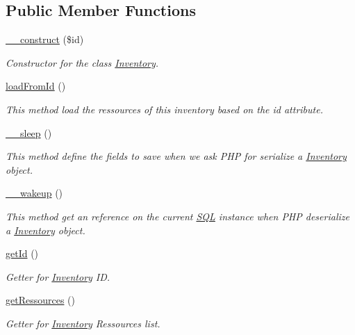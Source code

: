\subsection*{Public Member Functions}
\begin{DoxyCompactItemize}
\item 
\mbox{\hyperlink{classInventory_ad590054ec1e295007c7a7f14ecd12ac5}{\+\_\+\+\_\+construct}} (\$id)
\begin{DoxyCompactList}\small\item\em Constructor for the class \mbox{\hyperlink{classInventory}{Inventory}}. \end{DoxyCompactList}\item 
\mbox{\hyperlink{classInventory_ad5fa182aefcd1e26ae373b70bd23a7a5}{load\+From\+Id}} ()
\begin{DoxyCompactList}\small\item\em This method load the ressources of this inventory based on the id attribute. \end{DoxyCompactList}\item 
\mbox{\hyperlink{classInventory_af7c8af72b921f5d7ba545d62378b113b}{\+\_\+\+\_\+sleep}} ()
\begin{DoxyCompactList}\small\item\em This method define the fields to save when we ask P\+HP for serialize a \mbox{\hyperlink{classInventory}{Inventory}} object. \end{DoxyCompactList}\item 
\mbox{\label{classInventory_ada9aa6a6e88be3d5fce6b318e459664d}} 
\mbox{\hyperlink{classInventory_ada9aa6a6e88be3d5fce6b318e459664d}{\+\_\+\+\_\+wakeup}} ()
\begin{DoxyCompactList}\small\item\em This method get an reference on the current \mbox{\hyperlink{classSQL}{S\+QL}} instance when P\+HP deserialize a \mbox{\hyperlink{classInventory}{Inventory}} object. \end{DoxyCompactList}\item 
\mbox{\hyperlink{classInventory_ae571fc67c0f3bb9582de755f624ba680}{get\+Id}} ()
\begin{DoxyCompactList}\small\item\em Getter for \mbox{\hyperlink{classInventory}{Inventory}} ID. \end{DoxyCompactList}\item 
\mbox{\hyperlink{classInventory_a9b570bb7650509c786bc066347229979}{get\+Ressources}} ()
\begin{DoxyCompactList}\small\item\em Getter for \mbox{\hyperlink{classInventory}{Inventory}} Ressources list. \end{DoxyCompactList}\end{DoxyCompactItemize}
